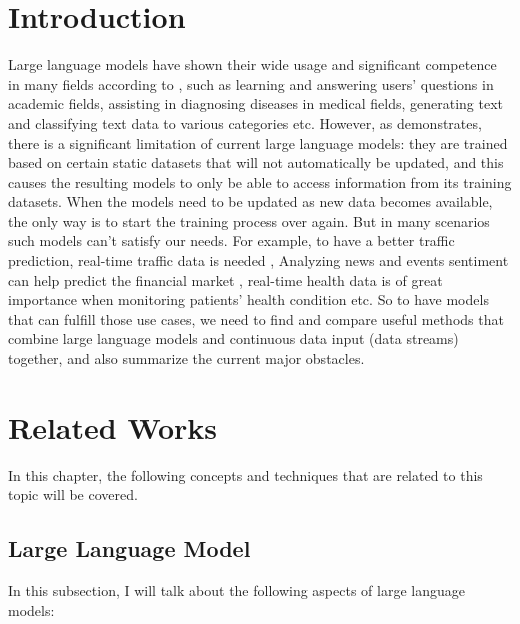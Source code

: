 \documentclass[runningheads]{llncs}
\begin{document}
\section{Introduction}
Large language models have shown their wide usage and significant competence in many fields according to \cite{Liu23}, such as learning and answering users' questions in academic fields,
assisting in diagnosing diseases in medical fields, generating text and classifying text data to various categories etc. However, as \cite{Gupta23} demonstrates, 
there is a significant limitation of current large language models: they are trained based on certain static datasets that will not automatically be updated, and this causes the resulting models to only be able to access information from its training datasets. 
When the models need to be updated as new data becomes available, the only way is to start the training process over again. But in many scenarios such models can't satisfy our needs. 
For example, to have a better traffic prediction, real-time traffic data is needed \cite{Zhang24},
Analyzing news and events sentiment can help predict the financial market \cite{Araci19}, 
real-time health data is of great importance when monitoring patients' health condition \cite{Thiru23} etc.
So to have models that can fulfill those use cases, we need to find and compare useful methods that combine large language models and continuous data input (data streams) together, and also summarize the current major obstacles. 

\section{Related Works}
In this chapter, the following concepts and techniques that are related to this topic will be covered.

\subsection{Large Language Model}
In this subsection, I will talk about the following aspects of large language models:
    
  
\end{document}
